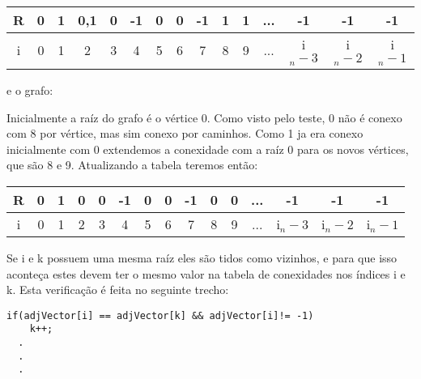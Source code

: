 \documentclass[a4paper,11pt]{article}
\begin{document}
\begin{table}[ht]
\centering
\begin{tabular}{c |c | c |c |c |c |c |c |c |c |c |c |c |c |c }
R & 0 & 1 & 0,1 & 0 & -1 & 0 & 0 & -1 & 1 & 1 & ... & -1 & -1 & -1 \\ \hline \hline
i & 0 & 1 & 2 & 3 & 4 & 5 & 6 & 7 & 8 & 9 & ... & i$_n-3$ & i$_n-2$ & i$_n-1$ 
\end{tabular}
\end{table}

e o grafo:

\begin{center}
\end{center}

Inicialmente a raíz do grafo é o vértice 0. Como visto pelo teste, 0 não é conexo com 8 por vértice, mas sim conexo por caminhos. Como 1 ja era conexo inicialmente com 0 extendemos a conexidade com a raíz 0 para os novos vértices, que são 8 e 9. Atualizando a tabela teremos então:

\begin{table}[ht]
\centering
\begin{tabular}{c |c | c |c |c |c |c |c |c |c |c |c |c |c |c }
R & 0 & 1 & 0 & 0 & -1 & 0 & 0 & -1 & 0 & 0 & ... & -1 & -1 & -1 \\ \hline \hline
i & 0 & 1 & 2 & 3 & 4 & 5 & 6 & 7 & 8 & 9 & ... & i$_n-3$ & i$_n-2$ & i$_n-1$ 
\end{tabular}
\end{table}

Se i e k possuem uma mesma raíz eles são tidos como vizinhos, e para que isso aconteça estes devem ter o mesmo valor na tabela de conexidades nos índices i e k. Esta verificação é feita no seguinte trecho:

\begin{lstlisting}[frame=single]
  if(adjVector[i] == adjVector[k] && adjVector[i]!= -1)
    k++;
  .
  .
  .
\end{lstlisting}
\end{document}
